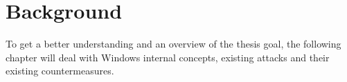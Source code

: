 \section{Background}
\label{sec:background}
To get a better understanding and an overview of the thesis goal, the following chapter will deal with Windows internal concepts, existing attacks and their existing countermeasures.




